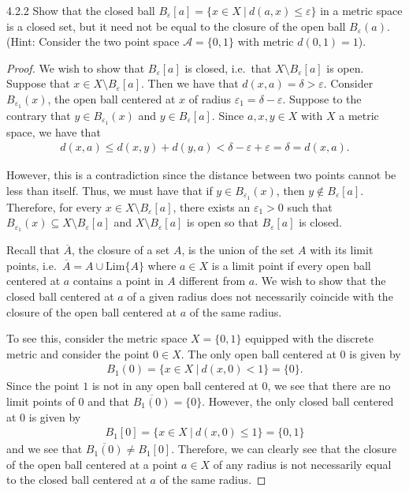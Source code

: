 \begin{problem}{4.2.2}
  Show that the closed ball $B_\varepsilon[a] = \{x \in X \ |\ d(a, x) \leq \varepsilon\}$
  in a metric space is a closed set, but it need not be equal to the closure
  of the open ball $B_\varepsilon(a)$. (Hint: Consider the two point space $\mathcal{A}= \{0, 1\}$ with metric $d(0, 1) = 1$).
\end{problem}

\begin{proof}
  We wish to show that $B_\varepsilon[a]$ is closed, i.e.\ that $X \setminus B_\varepsilon[a]$ is open. Suppose that
  $x \in X \setminus B_\varepsilon[a]$. Then we have that $d(x, a) = \delta > \varepsilon$.
  Consider $B_{\varepsilon_1}(x)$, the open ball centered at $x$ of radius $\varepsilon_1 = \delta - \varepsilon$.
  Suppose to the contrary that $y \in B_{\varepsilon_1}(x)$ and $y\in B_\varepsilon[a]$.
  Since $a, x, y \in X$ with $X$ a metric space, we have that
  \begin{align*}
    d(x, a) \leq d(x, y) + d(y, a) < \delta - \varepsilon + \varepsilon = \delta = d(x, a).
  \end{align*}

  However, this is a contradiction since the distance between two points cannot be less than itself.
  Thus, we must have that if $y \in B_{\varepsilon_1}(x)$,
  then $y \notin B_{\varepsilon}[a]$. Therefore, for every $x\in X \setminus B_\varepsilon[a]$,
  there exists an $\varepsilon_1 > 0$ such that $B_{\varepsilon_1}(x) \subseteq X \setminus B_\varepsilon[a]$
  and $X \setminus B_\varepsilon[a]$ is open so that $B_\varepsilon[a]$ is closed.

  Recall that $\overline{A}$, the closure of a set $A$, is the union of the set $A$ with its limit points,
  i.e.\ $\overline{A} = A \cup \text{Lim}\{A\}$ where $a \in X$ is a limit point if every open ball
  centered at $a$ contains a point in $A$ different from $a$.
  We wish to show that the closed ball centered at $a$ of a given radius
  does not necessarily coincide with the closure of the open ball centered at $a$ of the same radius.

  To see this, consider the metric space $X = \{0, 1\}$ equipped with the discrete metric
  and consider the point $0\in X$. The only open ball centered at 0 is given by
  \begin{align*}
    B_1(0)= \{x \in X \ |\ d(x, 0) < 1\} = \{0\}.
  \end{align*}
  Since the point $1$ is not in any open ball centered at $0$, we see that there are no limit points of
  $0$ and that $\overline{B_1(0)} = \{0\}$. However, the only closed ball centered at $0$ is given by
  \begin{align*}
    B_1[0] = \{x \in X \ |\ d(x, 0) \leq 1\} = \{0, 1\}
  \end{align*}
  and we see that $\overline{B_1(0)} \neq B_1[0]$.
  Therefore, we can clearly see that the closure of the open ball centered at a point $a\in X$
  of any radius is not necessarily equal to the closed ball centered at $a$ of the same radius.

\end{proof}
\newpage

